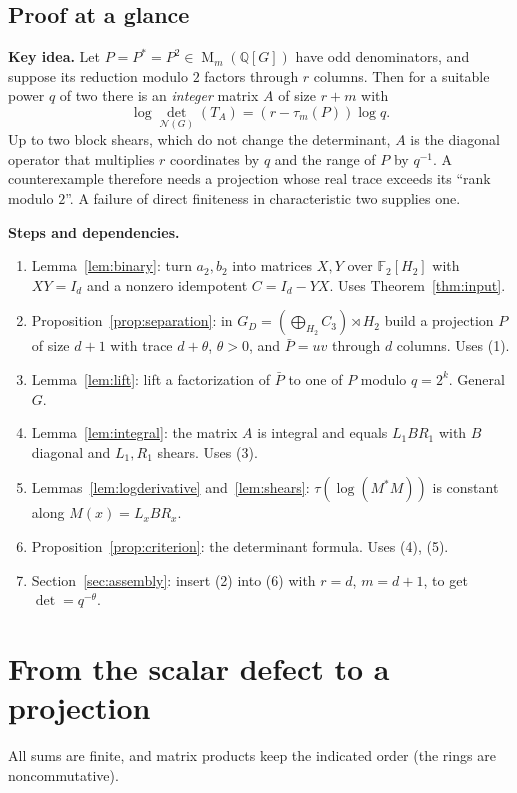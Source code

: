 \documentclass[11pt]{article}
\theoremstyle{remark}
\numberwithin{equation}{section}
\newcommand{\F}{\mathbb F}
\newcommand{\Q}{\mathbb Q}
\newcommand{\Mat}{\operatorname{M}}
\newcommand{\N}{\mathcal N}
\begin{document}
\subsection*{Proof at a glance}

\textbf{Key idea.} Let $P=P^*=P^2\in\Mat_m(\Q[G])$ have odd denominators, and suppose its reduction modulo $2$ factors through $r$ columns. Then for a suitable power $q$ of two there is an \emph{integer} matrix $A$ of size $r+m$ with
\[
 \log\det_{\N(G)}(T_A)=(r-\tau_m(P))\log q .
\]
Up to two block shears, which do not change the determinant, $A$ is the diagonal operator that multiplies $r$ coordinates by $q$ and the range of $P$ by $q^{-1}$. A counterexample therefore needs a projection whose real trace exceeds its ``rank modulo $2$''. A failure of direct finiteness in characteristic two supplies one.

\textbf{Steps and dependencies.}
\begin{enumerate}[label=(\arabic*),leftmargin=2.2em,itemsep=1pt]
\item Lemma~\ref{lem:binary}: turn $a_2,b_2$ into matrices $X,Y$ over $\F_2[H_2]$ with $XY=I_d$ and a nonzero idempotent $C=I_d-YX$. Uses Theorem~\ref{thm:input}.
\item Proposition~\ref{prop:separation}: in $G_D=(\bigoplus_{H_2}C_3)\rtimes H_2$ build a projection $P$ of size $d+1$ with trace $d+\theta$, $\theta>0$, and $\bar P=uv$ through $d$ columns. Uses (1).
\item Lemma~\ref{lem:lift}: lift a factorization of $\bar P$ to one of $P$ modulo $q=2^k$. General $G$.
\item Lemma~\ref{lem:integral}: the matrix $A$ is integral and equals $L_1BR_1$ with $B$ diagonal and $L_1,R_1$ shears. Uses (3).
\item Lemmas~\ref{lem:logderivative} and~\ref{lem:shears}: $\tau(\log(M^*M))$ is constant along $M(x)=L_xBR_x$.
\item Proposition~\ref{prop:criterion}: the determinant formula. Uses (4), (5).
\item Section~\ref{sec:assembly}: insert (2) into (6) with $r=d$, $m=d+1$, to get $\det=q^{-\theta}$.
\end{enumerate}

\section{From the scalar defect to a projection}
\label{sec:projection}

All sums are finite, and matrix products keep the indicated order (the rings are noncommutative).
\end{document}
